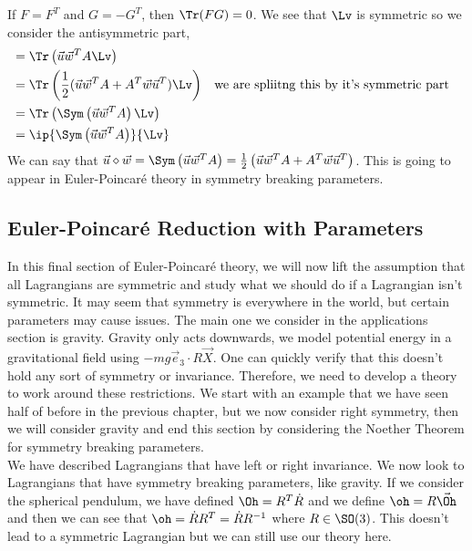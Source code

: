 
\noindent
If $F = F^T$ and $G = -G^T$, then $\Tr(FG) = 0$. We see that $\Lv$ is symmetric so we consider the antisymmetric part,
\begin{align*}
  &= \Tr\left(\vec u\vec w^T A \Lv \right)\\
  &= \Tr \left(\frac{1}{2}(\vec u\vec w^T A + A^T \vec w\vec u^T)\Lv \right) && \text{we are spliitng this by it's symmetric part} \\
  &= \Tr\left(\Sym\left(\vec u\vec w^T A\right)\Lv\right) \\
  &= \ip{\Sym\left(\vec u\vec w^T A\right)}{\Lv}
\end{align*}
We can say that $\vec u \diamond \vec w = \Sym\left(\vec u\vec w^T A\right) = \frac{1}{2}\left(\vec u\vec w^T A + A^T \vec w\vec u^T\right)$. This is going to appear in Euler-Poincar\'e theory in symmetry breaking parameters.

\subsection{Euler-Poincar\'e Reduction with Parameters}
In this final section of Euler-Poincar\'e theory, we will now lift the assumption that all Lagrangians are symmetric and study what we should do if a Lagrangian isn't symmetric. It may seem that symmetry is everywhere in the world, but certain parameters may cause issues. The main one we consider in the applications section is gravity. Gravity only acts downwards, we model potential energy in a gravitational field using $-mg\vec e_3 \cdot R\vec X$. One can quickly verify that this doesn't hold any sort of symmetry or invariance. Therefore, we need to develop a theory to work around these restrictions. We start with an example that we have seen half of before in the previous chapter, but we now consider right symmetry, then we will consider gravity and end this section by considering the Noether Theorem for symmetry breaking parameters.\\

\noindent
We have described Lagrangians that have left or right invariance. We now look to Lagrangians that have symmetry breaking parameters, like gravity. If we consider the spherical pendulum, we have defined $\Oh = R^T\dot R$ and we define $\oh = R\vec\Oh$ and then we can see that $\oh = \dot R R^T = \dot R R^{-1}$ where $R \in \SO(3)$. This doesn't lead to a symmetric Lagrangian but we can still use our theory here. \\

